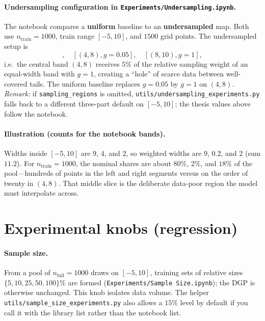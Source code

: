 \paragraph{Undersampling configuration in \texttt{Experiments/Undersampling.ipynb}.}
The notebook compares a \textbf{uniform} baseline to an \textbf{undersampled} map. Both use $n_{\mathrm{train}}=1000$, train range $[-5,10]$, and $1500$ grid points. The undersampled setup is
\begin{equation*}
  [({-}5,4), g{=}1],\quad [(4,8), g{=}0.05],\quad [(8,10), g{=}1],
\end{equation*}
i.e.\ the central band $(4,8)$ receives $5\%$ of the relative sampling weight of an equal-width band with $g{=}1$, creating a ``hole'' of scarce data between well-covered tails. The uniform baseline replaces $g{=}0.05$ by $g{=}1$ on $(4,8)$. \textit{Remark:} if \texttt{sampling\_regions} is omitted, \texttt{utils/undersampling\_experiments.py} falls back to a different three-part default on $[-5,10]$; the thesis values above follow the notebook.

\paragraph{Illustration (counts for the notebook bands).}
Widths inside $[-5,10]$ are $9$, $4$, and $2$, so weighted widths are $9$, $0.2$, and $2$ (sum $11.2$). For $n_{\mathrm{train}}{=}1000$, the nominal shares are about $80\%$, $2\%$, and $18\%$ of the pool---hundreds of points in the left and right segments versus on the order of twenty in $(4,8)$. That middle slice is the deliberate data-poor region the model must interpolate across.

\section{Experimental knobs (regression)}
\label{sec:knobs-regression}

\paragraph{Sample size.}
From a pool of $n_{\mathrm{full}}=1000$ draws on $[-5,10]$, training sets of relative sizes $\{5,10,25,50,100\}\%$ are formed (\texttt{Experiments/Sample Size.ipynb}); the DGP is otherwise unchanged. This knob isolates data volume. The helper \texttt{utils/sample\_size\_experiments.py} also allows a $15\%$ level by default if you call it with the library list rather than the notebook list.

